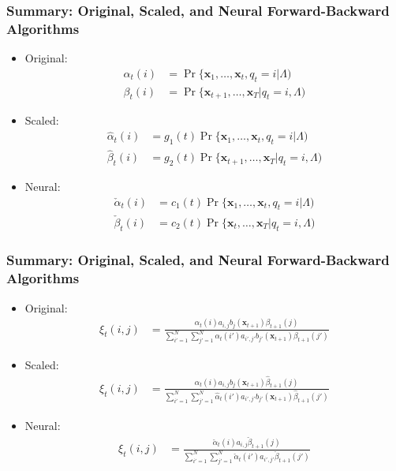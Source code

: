 \documentclass{beamer}
\begin{document}
\begin{frame}
  \frametitle{Summary: Original, Scaled, and Neural Forward-Backward Algorithms}

  \begin{itemize}
  \item Original:
    \begin{align*}
      \alpha_t(i) &= \Pr\{\mathbf{x}_1,\ldots,\mathbf{x}_t,q_t=i|\Lambda)\\
      \beta_t(i) &= \Pr\{\mathbf{x}_{t+1},\ldots,\mathbf{x}_T|q_t=i,\Lambda)
    \end{align*}
  \item Scaled:
    \begin{align*}
      \hat\alpha_t(i) &= g_1(t)\Pr\{\mathbf{x}_1,\ldots,\mathbf{x}_t,q_t=i|\Lambda)\\
      \hat\beta_t(i) &= g_2(t)\Pr\{\mathbf{x}_{t+1},\ldots,\mathbf{x}_T|q_t=i,\Lambda)
    \end{align*}
  \item Neural:
    \begin{align*}
      \check\alpha_t(i) &= c_1(t)\Pr\{\mathbf{x}_1,\ldots,\mathbf{x}_t,q_t=i|\Lambda)\\
      \check\beta_t(i) &= c_2(t)\Pr\{\mathbf{x}_{t},\ldots,\mathbf{x}_T|q_t=i,\Lambda)
    \end{align*}
  \end{itemize}
\end{frame}

\begin{frame}
  \frametitle{Summary: Original, Scaled, and Neural Forward-Backward Algorithms}
  \begin{itemize}
  \item Original:
    \begin{align*}
      \xi_t(i,j)
      &=\frac{\alpha_t(i)a_{i,j}b_j(\mathbf{x}_{t+1})\beta_{t+1}(j)}{\sum_{i'=1}^N\sum_{j'=1}^N\alpha_t(i')a_{i',j'}b_{j'}(\mathbf{x}_{t+1})\beta_{t+1}(j')}
    \end{align*}
  \item Scaled:
    \begin{align*}
      \xi_t(i,j)
      &=\frac{\hat\alpha_t(i)a_{i,j}b_j(\mathbf{x}_{t+1})\hat\beta_{t+1}(j)}{\sum_{i'=1}^N\sum_{j'=1}^N\hat\alpha_t(i')a_{i',j'}b_{j'}(\mathbf{x}_{t+1})\hat\beta_{t+1}(j')}
    \end{align*}
  \item Neural:
    \begin{align*}
      \xi_t(i,j)
      &=\frac{\check\alpha_t(i)a_{i,j}\check\beta_{t+1}(j)}{\sum_{i'=1}^N\sum_{j'=1}^N\check\alpha_t(i')a_{i',j'}\check\beta_{t+1}(j')}
    \end{align*}
  \end{itemize}
\end{frame}
\end{document}
